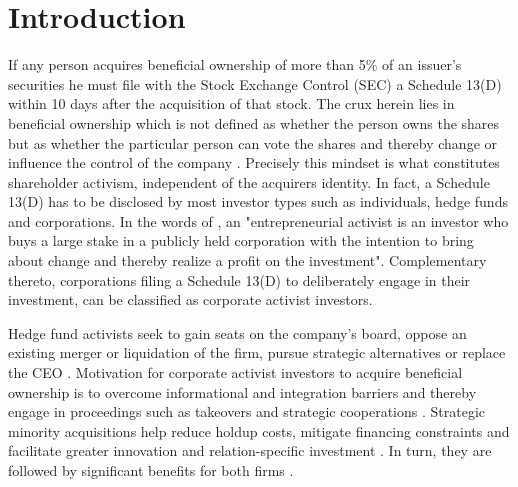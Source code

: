 \documentclass[12pt]{article}
\newcounter{savepage}
\begin{document}
\cleardoublepage
{}

\section{Introduction}

If any person acquires beneficial ownership of more than 5\% of an issuer's securities he must file with the Stock Exchange Control (SEC) a Schedule 13(D) within 10 days after the acquisition of that stock. The crux herein lies in beneficial ownership which is not defined as whether the person owns the shares but as whether the particular person can vote the shares and thereby change or influence the control of the company \citep[p.24]{Morrison2015}. Precisely this mindset is what constitutes shareholder activism, independent of the acquirers identity. In fact, a Schedule 13(D) has to be disclosed by most investor types such as individuals, hedge funds and corporations. In the words of \citet[p.187]{Klein2009}, an "entrepreneurial activist is an investor who buys a large stake in a publicly held corporation with the intention to bring about change and thereby realize a profit on the investment". Complementary thereto, corporations filing a Schedule 13(D) to deliberately engage in their investment, can be classified as corporate activist investors. 

Hedge fund activists seek to gain seats on the company's board, oppose an existing merger or liquidation of the firm, pursue strategic alternatives or replace the CEO \citep[p.188]{Klein2009}. Motivation for corporate activist investors to acquire beneficial ownership is to overcome informational and integration barriers and thereby engage in proceedings such as takeovers and strategic cooperations \citep[p.1]{Huang2017}. Strategic minority acquisitions help reduce holdup costs, mitigate financing constraints and facilitate greater innovation and relation-specific investment \citep[p.825]{Wang2014}. In turn, they are followed by significant benefits for both firms \citep[p.2793]{Allen2000}.
\end{document}
